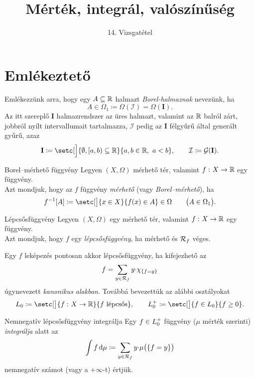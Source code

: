 \documentclass[
]{elteikthesis}[2024/04/26]
\title{Mérték, integrál, valószínűség} %
\subtitle{14. Vizsgatétel}
\begin{document}
	
	
	\section{Emlékeztető}
	
	Emlékezzünk arra, hogy egy \( A \subseteq \mathbb{R} \) halmazt \emph{Borel-halmaznak} nevezünk, ha
	\[
		A \in \Omega_1 \coloneq \Omega( \mathcal{I} ) = \Omega( \mathbf{I} ).
	\]
	Az itt szereplő \( \mathbf{I} \) halmazrendszer az üres halmazt, 
	valamint az \( \mathbb{R} \) balról zárt, jobbról nyílt intervallumait tartalmazza,
	\( \mathcal{I} \) pedig az \( \mathbf{I} \) félgyűrű által generált gyűrű, azaz
	\[
		\mathbf{I} \coloneq 
		\setc[\Big]{ \emptyset, [a, b) \subseteq \R }{ a, b \in \R, \ a < b }, \qquad
		\mathcal{I} \coloneq
		\mathcal{G}( \mathbf{I} ).
	\]
	\begin{definition}{Borel--mérhető függvény}{}	
		Legyen \( (X, \Omega) \) mérhető tér, valamint \( f \,\colon X \to \mathbb{R} \) egy függvény.\\[3pt]
		Azt mondjuk, hogy az \( f \) függvény \emph{mérhető} (vagy \emph{Borel--mérhető}), ha
		\[
		f^{-1}[A] \coloneq
		\setc[\big]{ x \in X }{ f(x) \in A } \in \Omega
		\qquad \bigl( A \in \Omega_1 \bigr).
		\]
	\end{definition}
	
	\begin{definition}{Lépcsősfüggvény}{}
		Legyen \( (X, \Omega) \) egy mérhető tér, valamint \( f \,\colon X \to \mathbb{R} \) egy függvény.\\[3pt]
		Azt mondjuk, hogy \( f \) egy \emph{lépcsősfüggvény}, 
		ha mérhető és \( \mathcal{R}_{f} \) véges.
	\end{definition}
	
	Egy \( f \) leképezés pontosan akkor lépcsősfüggvény, ha kifejezhető az
	\[
		f = \sum_{y \in \mathcal{R}_{f}} y {\cdot} \chi_{\{ f = y \}}
	\]
	úgynevezett \emph{kanonikus alakban}. Továbbá bevezettük az alábbi osztályokat
	\[
		\StepFunc \coloneq \setc[\big]{ \func{f}{X}{\R} }{ f \text{ lépcsős}}, \qquad
		\StepFuncPos \coloneq \setc[\big]{ f \in \StepFunc }{ f \geq 0 }. 
	\]
	
	\begin{definition}{Nemnegatív lépcsősfüggvény integrálja}{}
		Egy \( f \in \StepFuncPos \) függvény (\( \mu \) mérték szerinti) \emph{integrálja} alatt az
		\[
		\int f \mathop{}\!\mathrm{d}{\mu} \coloneq
		\sum_{y \in \mathcal{R}_{f}} y {\cdot} \mu \bigl( \{ f = y \} \bigr)
		\]
		nemnegatív számot (vagy a \( +\infty \)-t) értjük.
	\end{definition}
	
\end{document}
